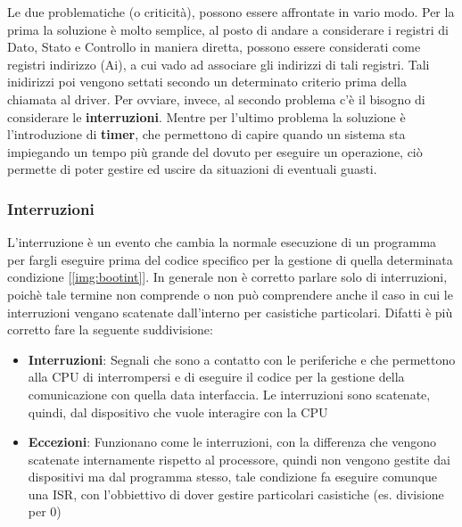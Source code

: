 Le due problematiche (o criticità), possono essere affrontate in vario modo. Per la prima la soluzione è molto semplice, al posto di andare a considerare i registri di Dato, Stato e Controllo in maniera diretta, possono essere considerati come registri indirizzo (Ai), a cui vado ad associare gli indirizzi di tali registri. Tali inidirizzi poi vengono settati secondo un determinato criterio prima della chiamata al driver.
Per ovviare, invece, al secondo problema c'è il bisogno di considerare le \textbf{interruzioni}. Mentre per l'ultimo problema la soluzione è l'introduzione di \textbf{timer}, che permettono di capire quando un sistema sta impiegando un tempo più grande del dovuto per eseguire un operazione, ciò permette di poter gestire ed uscire da situazioni di eventuali guasti.

\subsubsection{Interruzioni}
L'interruzione è un evento che cambia la normale esecuzione di un programma per fargli eseguire prima del codice specifico per la gestione di quella determinata condizione [\ref{img:bootint}]. In generale non è corretto parlare solo di interruzioni, poichè tale termine non comprende o non può comprendere anche il caso in cui le interruzioni vengano scatenate dall'interno per casistiche particolari. Difatti è più corretto fare la seguente suddivisione:
\begin{itemize}
    \item \textbf{Interruzioni}: Segnali che sono a contatto con le periferiche e che permettono alla CPU di interrompersi e di eseguire il codice per la gestione della comunicazione con quella data interfaccia. Le interruzioni sono scatenate, quindi, dal dispositivo che vuole interagire con la CPU
    \item \textbf{Eccezioni}: Funzionano come le interruzioni, con la differenza che vengono scatenate internamente rispetto al processore, quindi non vengono gestite dai dispositivi ma dal programma stesso, tale condizione fa eseguire comunque una ISR, con l'obbiettivo di dover gestire particolari casistiche (es. divisione per 0)
\end{itemize}

